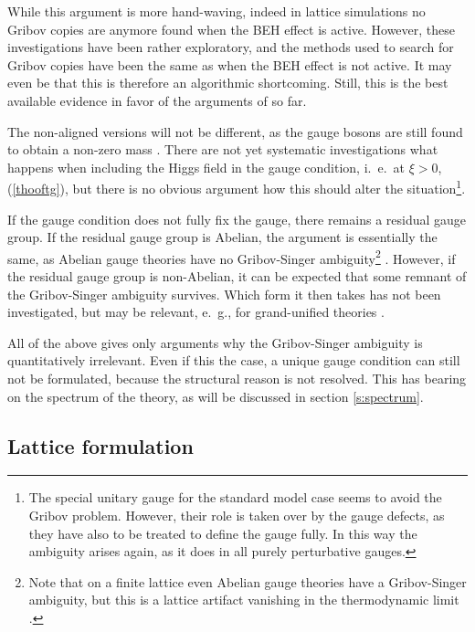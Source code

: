 \documentclass[final,12pt,3p,longtitle]{elsarticle}
\newcommand*{\pref}[1]{(\ref{#1})}
\newcommand*{\1}{1\!\!\!\bot}
\begin{document}
While this argument is more hand-waving, indeed in lattice simulations \cite{Maas:2010nc} no Gribov copies are anymore found when the BEH effect is active. However, these investigations have been rather exploratory, and the methods used to search for Gribov copies have been the same as when the BEH effect is not active. It may even be that this is therefore an algorithmic shortcoming. Still, this is the best available evidence in favor of the arguments of \cite{Lenz:2000zt} so far.

The non-aligned versions will not be different, as the gauge bosons are still found to obtain a non-zero mass \cite{Maas:2010nc}. There are not yet systematic investigations what happens when including the Higgs field in the gauge condition, i.\ e.\ at $\xi>0$, \pref{thooftg}, but there is no obvious argument how this should alter the situation\footnote{The special unitary gauge for the standard model case \cite{Bohm:2001yx} seems to avoid the Gribov problem. However, their role is taken over by the gauge defects, as they have also to be treated to define the gauge fully. In this way the ambiguity arises again, as it does in all purely perturbative gauges.}.

If the gauge condition does not fully fix the gauge, there remains a residual gauge group. If the residual gauge group is Abelian, the argument is essentially the same, as Abelian gauge theories have no Gribov-Singer ambiguity\footnote{Note that on a finite lattice even Abelian gauge theories have a Gribov-Singer ambiguity, but this is a lattice artifact vanishing in the thermodynamic limit \cite{deForcrand:1994mz,Giusti:2001xf}.} \cite{Lenz:1994tb,Lenz:2000zt}. However, if the residual gauge group is non-Abelian, it can be expected that some remnant of the Gribov-Singer ambiguity survives. Which form it then takes has not been investigated, but may be relevant, e.\ g., for grand-unified theories \cite{Georgi:1974sy,Georgi:1974yf,Langacker:1980js}.

All of the above gives only arguments why the Gribov-Singer ambiguity is quantitatively irrelevant. Even if this the case, a unique gauge condition can still not be formulated, because the structural reason is not resolved. This has bearing on the spectrum of the theory, as will be discussed in section \ref{s:spectrum}.

\subsection{Lattice formulation}\label{ss:lattice}
\end{document}
